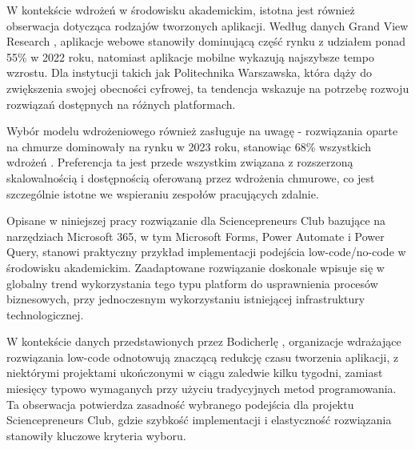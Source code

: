 W kontekście wdrożeń w środowisku akademickim, istotna jest również obserwacja dotycząca rodzajów tworzonych aplikacji. Według danych Grand View Research \parencite[s. 173]{bodicherla2025}, aplikacje webowe stanowiły dominującą część rynku z udziałem ponad 55\% w 2022 roku, natomiast aplikacje mobilne wykazują najszybsze tempo wzrostu. Dla instytucji takich jak Politechnika Warszawska, która dąży do zwiększenia swojej obecności cyfrowej, ta tendencja wskazuje na potrzebę rozwoju rozwiązań dostępnych na różnych platformach.

Wybór modelu wdrożeniowego również zasługuje na uwagę - rozwiązania oparte na chmurze dominowały na rynku w 2023 roku, stanowiąc 68\% wszystkich wdrożeń \parencite[s. 173]{bodicherla2025}. Preferencja ta jest przede wszystkim związana z rozszerzoną skalowalnością i dostępnością oferowaną przez wdrożenia chmurowe, co jest szczególnie istotne we wspieraniu zespołów pracujących zdalnie.

Opisane w niniejszej pracy rozwiązanie dla Sciencepreneurs Club bazujące na narzędziach Microsoft 365, w tym Microsoft Forms, Power Automate i Power Query, stanowi praktyczny przykład implementacji podejścia low-code/no-code w środowisku akademickim. Zaadaptowane rozwiązanie doskonale wpisuje się w globalny trend wykorzystania tego typu platform do usprawnienia procesów biznesowych, przy jednoczesnym wykorzystaniu istniejącej infrastruktury technologicznej.

W kontekście danych przedstawionych przez Bodicherlę \parencite[s. 172]{bodicherla2025}, organizacje wdrażające rozwiązania low-code odnotowują znaczącą redukcję czasu tworzenia aplikacji, z niektórymi projektami ukończonymi w ciągu zaledwie kilku tygodni, zamiast miesięcy typowo wymaganych przy użyciu tradycyjnych metod programowania. Ta obserwacja potwierdza zasadność wybranego podejścia dla projektu Sciencepreneurs Club, gdzie szybkość implementacji i elastyczność rozwiązania stanowiły kluczowe kryteria wyboru.
